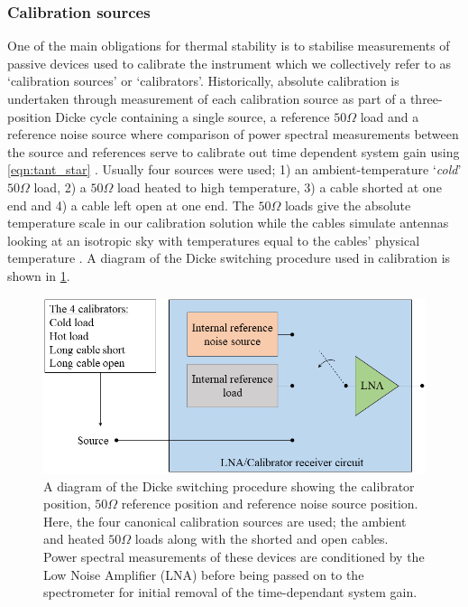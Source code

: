 \subsubsection{Calibration sources}
One of the main obligations for thermal stability is to stabilise measurements of passive devices used to calibrate the instrument which we collectively refer to as ‘calibration sources’ or ‘calibrators’. Historically, absolute calibration is undertaken through measurement of each calibration source as part of a three-position Dicke cycle containing a single source, a reference $50 \Omega$ load and a reference noise source where comparison of power spectral measurements between the source and references serve to calibrate out time dependent system gain using \cref{eqn:tant_star} \citet{edgesCal,rogersCal}. Usually four sources were used; 1) an ambient-temperature ‘\textit{cold}’ $50 \Omega$ load, 2) a $50 \Omega$ load heated to high temperature, 3) a cable shorted at one end and 4) a cable left open at one end. The $50 \Omega$ loads give the absolute temperature scale in our calibration solution while the cables simulate antennas looking at an isotropic sky with temperatures equal to the cables’ physical temperature \citep{rogersCal}. A diagram of the Dicke switching procedure used in calibration is shown in \cref{fig:dicke}.
\begin{figure}
    \centering
    \includegraphics[scale=0.5]{dicke}
    \caption{A diagram of the Dicke switching procedure showing the calibrator position, $50 \Omega$ reference position and reference noise source position. Here, the four canonical calibration sources are used; the ambient and heated $50 \Omega$ loads along with the shorted and open cables. Power spectral measurements of these devices are conditioned by the Low Noise Amplifier (LNA) before being passed on to the spectrometer for initial removal of the time-dependant system gain.}
    \label{fig:dicke}
\end{figure}


